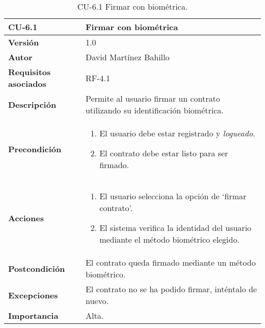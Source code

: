\begin{table}[p]
	\centering
	\begin{tabularx}{\linewidth}{ p{} p{} }
		\toprule
		\textbf{CU-6.1}  & \textbf{Firmar con biométrica}\\
		\midrule
		\textbf{Versión}              & 1.0    \\
		\textbf{Autor}                & David Martínez Bahillo \\
		\textbf{Requisitos asociados} & RF-4.1 \\
		\textbf{Descripción}          & Permite al usuario firmar un contrato utilizando su identificación biométrica. \\
		\textbf{Precondición}         &  
		\begin{enumerate}
			\def\labelenumi{\arabic{enumi}.}
			\tightlist
			\item El usuario debe estar registrado y \textit{logueado}.
			\item El contrato debe estar listo para ser firmado.
		\end{enumerate}\\
		\textbf{Acciones}             &
		\begin{enumerate}
			\def\labelenumi{\arabic{enumi}.}
			\tightlist
			\item El usuario selecciona la opción de `firmar contrato'.
			\item El sistema verifica la identidad del usuario mediante el método biométrico elegido.
		\end{enumerate}\\
		\textbf{Postcondición}        & El contrato queda firmado mediante un método biométrico. \\
		\textbf{Excepciones}          & El contrato no se ha podido firmar, 
		inténtalo de nuevo. \\
		\textbf{Importancia}          & Alta.  \\
		\bottomrule
	\end{tabularx}
	\caption{CU-6.1 Firmar con biométrica.}
\end{table}


